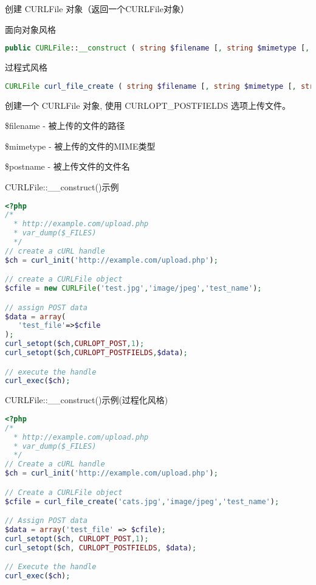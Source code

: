 创建 CURLFile 对象（返回一个CURLFile对象）


\begin{compactitem}
\item 面向对象风格

\begin{lstlisting}[language=PHP]
public CURLFile::__construct ( string $filename [, string $mimetype [, string $postname ]] )
\end{lstlisting}

\item 过程式风格

\begin{lstlisting}[language=PHP]
CURLFile curl_file_create ( string $filename [, string $mimetype [, string $postname ]] )
\end{lstlisting}

\end{compactitem}

创建一个 CURLFile 对象, 使用 CURLOPT\_POSTFIELDS 选项上传文件。


\begin{compactitem}
\item \$filename - 被上传的文件的路径
\item \$mimetype - 被上传的文件的MIME类型
\item \$postname - 被上传文件的文件名
\end{compactitem}

\begin{example}
CURLFile::\_\_construct()示例
\begin{lstlisting}[language=PHP]
<?php
/*
  * http://example.com/upload.php
  * var_dump($_FILES)
  */
// create a cURL handle
$ch = curl_init('http://example.com/upload.php');

// create a CURLFile object
$cfile = new CURLFile('test.jpg','image/jpeg','test_name');

// assign POST data
$data = array(
   'test_file'=>$cfile
);
curl_setopt($ch,CURLOPT_POST,1);
curl_setopt($ch,CURLOPT_POSTFIELDS,$data);

// execute the handle
curl_exec($ch);
\end{lstlisting}
\end{example}


\begin{example}
CURLFile::\_\_construct()示例(过程化风格)
\begin{lstlisting}[language=PHP]
<?php
/*
  * http://example.com/upload.php
  * var_dump($_FILES)
  */
// Create a cURL handle
$ch = curl_init('http://example.com/upload.php');

// Create a CURLFile object
$cfile = curl_file_create('cats.jpg','image/jpeg','test_name');

// Assign POST data
$data = array('test_file' => $cfile);
curl_setopt($ch, CURLOPT_POST,1);
curl_setopt($ch, CURLOPT_POSTFIELDS, $data);

// Execute the handle
curl_exec($ch);
\end{lstlisting}
\end{example}

